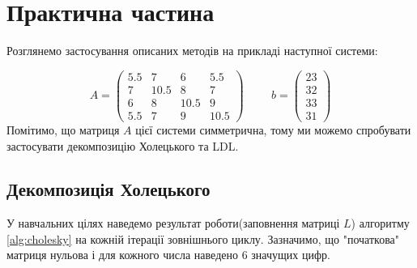 \section*{\centering Практична частина}

Розглянемо застосування описаних методів на прикладі наступної системи:

\[
    A = \begin{pmatrix}
        5.5 & 7 & 6 & 5.5 \\
        7 & 10.5 & 8 & 7 \\
        6 & 8 & 10.5 & 9 \\
        5.5 & 7 & 9 & 10.5
    \end{pmatrix} \hspace{1cm}
    b = \begin{pmatrix}
        23 \\
        32 \\
        33 \\
        31
    \end{pmatrix}
\]
Помітимо, що матриця $A$ цієї системи симметрична,
тому ми можемо спробувати застосувати декомпозицію
Холецького та LDL.

\subsection*{Декомпозиція Холецького}

У навчальних цілях наведемо результат роботи(заповнення матриці $L$)
алгоритму \ref{alg:cholesky} на кожній ітерації зовнішнього циклу.
Зазначимо, що "початкова" матриця нульова і для кожного числа
наведено 6 значущих цифр.

